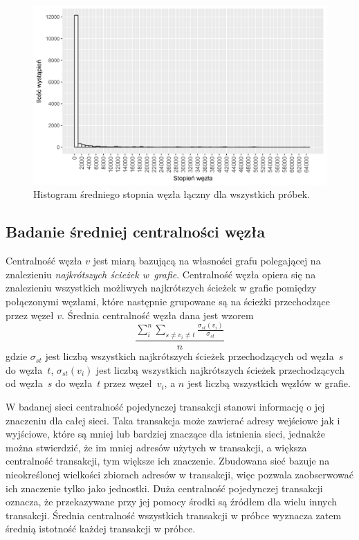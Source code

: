 \documentclass[12pt, twoside, final, openany]{mgr}
\newcommand{\chartsWidth}{0.8}
\begin{document}
\begin{figure}[H]
   \includegraphics[width=\chartsWidth\linewidth]{pictures/sredni_stopien_wezla/sredni_stopien_wezla_hist.png}
   \caption{Histogram średniego stopnia węzła łączny dla wszystkich próbek.}
   \label{fig:sw3}
\end{figure}

\subsection{Badanie średniej centralności węzła}
\label{srednia_centralnosc}
\indent Centralność węzła $v$ jest miarą bazującą na własności grafu polegającej na znalezieniu \textit{najkrótszych ścieżek w~grafie}. Centralność węzła opiera się na znalezieniu wszystkich możliwych najkrótszych ścieżek w grafie pomiędzy połączonymi węzłami, które następnie grupowane są na ścieżki przechodzące przez węzeł $v$. Średnia centralność węzła dana jest wzorem 
\begin{equation}
\label{eq:centralnosc}
  \frac{\sum_i^n\sum_{s \ne v_i \ne t}^{}\frac{\sigma_{st}(v_i)}{\sigma_{st}}}{n}
\end{equation} 
gdzie $\sigma_{st}$ jest liczbą wszystkich najkrótszych ścieżek przechodzących od węzła~$s$ do węzła~$t$, $\sigma_{st}(v_i)$ jest liczbą wszystkich najkrótszych ścieżek przechodzących od węzła~$s$ do węzła~$t$ przez węzeł~$v_i$, a $n$ jest liczbą wszystkich węzłów w grafie.

\indent W badanej sieci centralność pojedynczej transakcji stanowi informację o jej znaczeniu dla całej sieci. Taka transakcja może zawierać adresy wejściowe jak i wyjściowe, które są mniej lub bardziej znaczące dla istnienia sieci, jednakże można stwierdzić, że im mniej adresów użytych w transakcji, a większa centralność transakcji, tym większe ich znaczenie. Zbudowana sieć bazuje na nieokreślonej wielkości zbiorach adresów w transakcji, więc pozwala zaobserwować ich znaczenie tylko jako jednostki. Duża centralność pojedynczej transakcji oznacza, że przekazywane przy jej pomocy środki są źródłem dla wielu innych transakcji. Średnia centralność wszystkich transakcji w próbce wyznacza zatem średnią istotność każdej transakcji w próbce.
\end{document}
